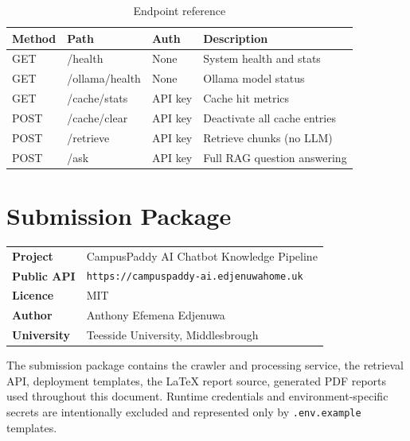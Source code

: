 \documentclass[12pt,a4paper]{report}
\begin{document}
\begin{table}[H]
\centering
\caption{Endpoint reference}
\begin{tabular}{lllp{5cm}}
\toprule
\textbf{Method} & \textbf{Path} & \textbf{Auth} & \textbf{Description} \\
\midrule
GET  & /health        & None       & System health and stats \\
GET  & /ollama/health & None       & Ollama model status \\
GET  & /cache/stats   & API key    & Cache hit metrics \\
POST & /cache/clear   & API key    & Deactivate all cache entries \\
POST & /retrieve      & API key    & Retrieve chunks (no LLM) \\
POST & /ask           & API key    & Full RAG question answering \\
\bottomrule
\end{tabular}
\end{table}

\chapter{Submission Package}

\begin{center}
\begin{tabular}{ll}
\toprule
\textbf{Project}           & CampusPaddy AI Chatbot Knowledge Pipeline \\
\textbf{Public API}        & \texttt{https://campuspaddy-ai.edjenuwahome.uk} \\
\textbf{Licence}           & MIT \\
\textbf{Author}            & Anthony Efemena Edjenuwa \\
\textbf{University}        & Teesside University, Middlesbrough \\
\bottomrule
\end{tabular}
\end{center}

\medskip

\noindent The submission package contains the crawler and processing service, the retrieval API, deployment templates, the LaTeX report source, generated PDF reports used throughout this document. Runtime credentials and environment-specific secrets are intentionally excluded and represented only by \texttt{.env.example} templates.
\end{document}
